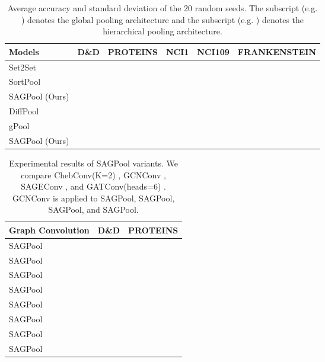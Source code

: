 \documentclass{article}
\begin{document}
\begin{table*}
\caption{Average accuracy and standard deviation of the 20 random seeds. The subscript  (e.g. ) denotes the global pooling architecture and the subscript  (e.g. ) denotes the hierarchical pooling architecture.}
\label{tab:results}
\vskip 0.15in
\begin{center}
\begin{small}
\begin{tabular}{lccccc}
\toprule
\textbf{Models} & \textbf{D\&D} & \textbf{PROTEINS} & \textbf{NCI1} & \textbf{NCI109} & \textbf{FRANKENSTEIN} \\

\midrule
Set2Set     &  &  &  &  &  \\
SortPool    &  &  &  &  &  \\
SAGPool (Ours)  &  &  &  &  &   \\
\midrule
DiffPool            &  &  &  &  &   \\
gPool               &  &  &  &  &   \\
SAGPool  (Ours)     &  &  &  &  &   \\
\bottomrule
\end{tabular}
\end{small}
\end{center}
\vskip -0.1in
\end{table*}



\begin{table}
\caption{Experimental results of SAGPool variants. We compare  ChebConv(K=2) \cite{defferrard2016convolutional}, GCNConv \cite{kipf2016semi}, SAGEConv \cite{hamilton2017inductive}, and GATConv(heads=6) \cite{veličković2018graph}. GCNConv is applied to SAGPool, SAGPool, SAGPool, and SAGPool.}
\label{tab:variance}
\vskip 0.15in
\begin{center}
\begin{small}
\begin{tabular}{lcc}
\toprule
\textbf{Graph Convolution} & \textbf{D\&D} & \textbf{PROTEINS} \\
\midrule
SAGPool               &  &   \\
\midrule
SAGPool              &  &   \\
SAGPool              &  &   \\
SAGPool               &  &  \\
\midrule
SAGPool           &  &   \\
SAGPool    &  &   \\
\midrule
SAGPool      &  &   \\
SAGPool      &  &  \\
\bottomrule
\end{tabular}
\end{small}
\end{center}
\vskip -0.1in
\end{table}
\end{document}
